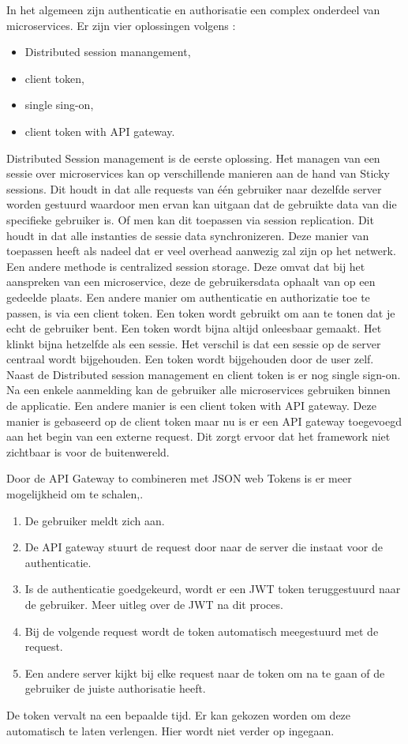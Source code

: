 In het algemeen zijn authenticatie en authorisatie een complex onderdeel van microservices.
Er zijn vier oplossingen volgens \textcite{Ayoub2018}:
\begin{itemize}
	\item Distributed session manangement,
	\item client token,
	\item single sing-on, 
	\item client token with API gateway.
\end{itemize}
Distributed Session management is de eerste oplossing. Het managen van een sessie over microservices kan op verschillende manieren aan de hand van Sticky sessions. Dit houdt in dat alle requests van één gebruiker naar dezelfde server worden gestuurd waardoor men ervan kan uitgaan dat de gebruikte data van die specifieke gebruiker is. Of men kan dit toepassen via session replication. Dit houdt in dat alle instanties de sessie data synchronizeren. Deze manier van toepassen heeft als nadeel dat er veel overhead aanwezig zal zijn op het netwerk. Een andere methode is centralized session storage. Deze omvat dat bij het aanspreken van een microservice, deze de gebruikersdata ophaalt van op een gedeelde plaats. 
Een andere manier om authenticatie en authorizatie toe te passen, is via een client token. Een token wordt gebruikt om aan te tonen dat je echt de gebruiker bent. Een token wordt bijna altijd onleesbaar gemaakt. Het klinkt bijna hetzelfde als een sessie. Het verschil is dat een sessie op de server centraal wordt bijgehouden. Een token wordt bijgehouden door de user zelf.
Naast de Distributed session management en client token is er nog single sign-on. Na een enkele aanmelding kan de gebruiker alle microservices gebruiken binnen de applicatie. 
Een andere manier is een client token with API gateway. Deze manier is gebaseerd op de client token maar nu is er een API gateway toegevoegd aan het begin van een externe request. Dit zorgt ervoor dat het framework niet zichtbaar is voor de buitenwereld. 

Door de API Gateway to combineren met JSON  web Tokens is er meer mogelijkheid om te schalen,\textcite{Siraj2017}. 
\begin{enumerate}
	\item De gebruiker meldt zich aan.
	\item De API gateway stuurt de request door naar de server die instaat voor de authenticatie.
	\item Is de authenticatie goedgekeurd, wordt er een JWT token teruggestuurd naar de gebruiker. Meer uitleg over de JWT na dit proces.
	\item Bij de volgende request wordt de token automatisch meegestuurd met de request.
	\item Een andere server kijkt bij elke request naar de token om na te gaan of de gebruiker de juiste authorisatie heeft. 
\end{enumerate}
De token vervalt na een bepaalde tijd. Er kan gekozen worden om deze automatisch te laten verlengen. Hier wordt niet verder op ingegaan. 

